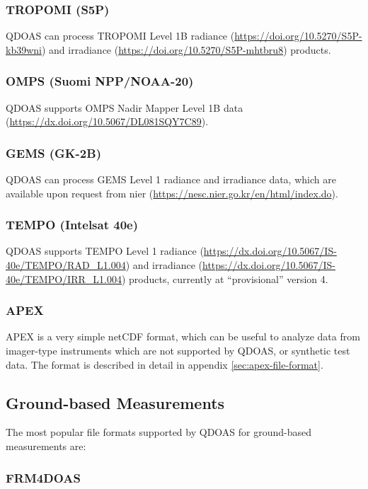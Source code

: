 \subsubsection{TROPOMI (S5P)}
QDOAS can process TROPOMI Level 1B radiance
(\url{https://doi.org/10.5270/S5P-kb39wni}) and irradiance
(\url{https://doi.org/10.5270/S5P-mhtbru8}) products.

\subsubsection{OMPS (Suomi NPP/NOAA-20)}
QDOAS supports OMPS Nadir Mapper Level 1B data (\url{https://dx.doi.org/10.5067/DL081SQY7C89}).

\subsubsection{GEMS (GK-2B)}
QDOAS can process GEMS Level 1 radiance and irradiance data, which are
available upon request from \gls{nier}
(\url{https://nesc.nier.go.kr/en/html/index.do}).

\subsubsection{TEMPO (Intelsat 40e)}
QDOAS supports TEMPO Level 1 radiance
(\url{https://dx.doi.org/10.5067/IS-40e/TEMPO/RAD_L1.004}) and
irradiance (\url{https://dx.doi.org/10.5067/IS-40e/TEMPO/IRR_L1.004})
products, currently at ``provisional'' version 4.

\subsubsection{APEX}
APEX is a very simple netCDF format, which can be useful to analyze data from imager-type instruments which are not supported by QDOAS, or synthetic test data.  The format is described in detail in appendix \ref{sec:apex-file-format}.

\subsection{Ground-based Measurements}

The most popular file formats supported by QDOAS for ground-based measurements are:

\subsubsection{FRM4DOAS}

